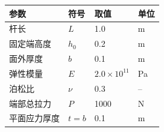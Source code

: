 \begin{tabular}{@{}llll@{}}
\toprule
参数 & 符号 & {取值} & 单位 \\
\midrule
杆长 & $L$ & 1.0 & m \\
固定端高度 & $h_0$ & 0.2 & m \\
面外厚度 & $b$ & 0.1 & m \\
弹性模量 & $E$ & $2.0\times10^{11}$ & Pa \\
泊松比 & $\nu$ & 0.3 & -- \\
端部总拉力 & $P$ & 1000 & N \\
平面应力厚度 & $t=b$ & 0.1 & m \\
\bottomrule
\end{tabular}
